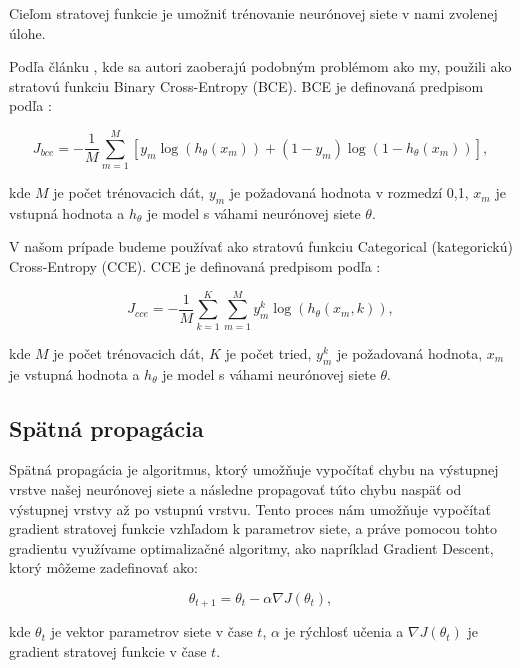 Cieľom stratovej funkcie je umožniť trénovanie neurónovej siete v nami zvolenej úlohe.

Podľa článku \cite{takada2023genelive}, kde sa autori zaoberajú podobným problémom ako my, použili ako stratovú funkciu Binary Cross-Entropy (BCE). BCE je definovaná predpisom podľa \cite{Yaoshiang2020ce}:

\begin{equation}
  J_{bce} = -\frac{1}{M}\sum_{m=1}^{M} \left[ y_{m} \log\left( h_{\theta}(x_{m}) \right) + (1 - y_{m}) \log\left( 1 - h_{\theta}(x_{m}) \right) \right],
\end{equation}

\noindent kde $M$ je počet trénovacich dát, $y_{m}$ je požadovaná hodnota v rozmedzí 0,1, $x_m$ je vstupná hodnota a $h_{\theta}$ je model s váhami neurónovej siete $\theta$.

V našom prípade budeme používať ako stratovú funkciu Categorical (kategorickú) Cross-Entropy (CCE). CCE je definovaná predpisom podľa \cite{Yaoshiang2020ce}:
  
\begin{equation} J_{cce}=-\frac {1}{M}\sum \limits _{k=1}^{K} \sum \limits _{m=1}^{M} {y_{m}^{k} \log \left ({h_{\theta }\left ({x_{m},k }\right) }\right)},
\end{equation}

\noindent kde $M$ je počet trénovacich dát, $K$ je počet tried, $y_{m}^{k}$ je požadovaná hodnota, $x_m$ je vstupná hodnota a $h_{\theta}$ je model s váhami neurónovej siete $\theta$.

\subsection{Spätná propagácia}

Spätná propagácia je algoritmus, ktorý umožňuje vypočítať chybu na výstupnej vrstve našej neurónovej siete a následne propagovať túto chybu naspäť od výstupnej vrstvy až po vstupnú vrstvu. Tento proces nám umožňuje vypočítať gradient stratovej funkcie vzhľadom k parametrov siete, a práve pomocou tohto gradientu využívame optimalizačné algoritmy, ako napríklad Gradient Descent, ktorý môžeme zadefinovať ako:

\begin{equation}
  \theta_{t+1} = \theta_{t} - \alpha \nabla J(\theta_{t}),
\end{equation}

\noindent kde $\theta_{t}$ je vektor parametrov siete v čase $t$, $\alpha$ je rýchlosť učenia a $\nabla J(\theta_{t})$ je gradient stratovej funkcie v čase $t$.

